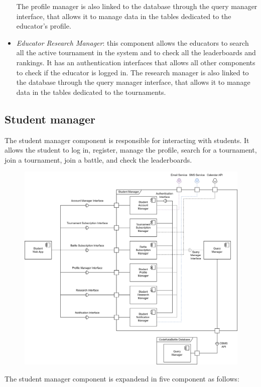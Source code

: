 \documentclass[12pt, a4paper]{report}
\begin{document}
\begin{itemize}
            The profile manager is also linked to the database through the query manager interface, that allows it to manage data in the tables dedicated to the educator's profile.
        \item \textit{Educator Research Manager}: this component allows the educators to search all the active tournament in the system and to check all the leaderboards and rankings. 
            It has an authentication interfaces that allows all other components to check if the educator is logged in.
            The research manager is also linked to the database through the query manager interface, that allows it to manage data in the tables dedicated to the tournaments.
    \end{itemize}
    
    \newpage

    \subsection{Student manager}
    The student manager component is responsible for interacting with students.
    It allows the student to log in, register, manage the profile, search for a tournament, join a tournament, join a battle, and check the leaderboards.  
    \begin{figure}[H]
        \centering
        \includegraphics[width=0.8\linewidth]{images/component_view_student.png}
    \end{figure}
    The student manager component is expandend in five component as follows: 
\end{document}
